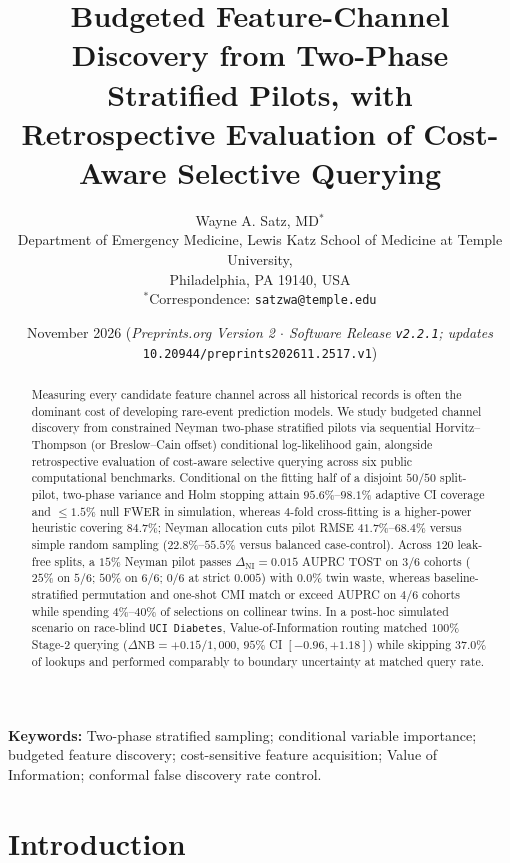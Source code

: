 \documentclass[11pt]{article}
\title{\textbf{Budgeted Feature-Channel Discovery from Two-Phase Stratified Pilots, with Retrospective Evaluation of Cost-Aware Selective Querying}}
\author{
  Wayne A. Satz, MD$^*$\\
  \small Department of Emergency Medicine, Lewis Katz School of Medicine at Temple University,\\
  \small Philadelphia, PA 19140, USA\\
  \small $^*$Correspondence: \texttt{satzwa@temple.edu}
}
\date{November 2026 \quad (\emph{Preprints.org Version 2 $\cdot$ Software Release \texttt{v2.2.1}; updates} \texttt{10.20944/preprints202611.2517.v1})}
\theoremstyle{remark}
\begin{document}
\maketitle

\begin{abstract}
Measuring every candidate feature channel across all historical records is often the dominant cost of developing rare-event prediction models. We study budgeted channel discovery from constrained Neyman two-phase stratified pilots via sequential Horvitz--Thompson (or Breslow--Cain offset) conditional log-likelihood gain, alongside retrospective evaluation of cost-aware selective querying across six public computational benchmarks. Conditional on the fitting half of a disjoint $50/50$ split-pilot, two-phase variance and Holm stopping attain $95.6\%\text{--}98.1\%$ adaptive CI coverage and $\le 1.5\%$ null FWER in simulation, whereas $4$-fold cross-fitting is a higher-power heuristic covering $84.7\%$; Neyman allocation cuts pilot RMSE $41.7\%\text{--}68.4\%$ versus simple random sampling ($22.8\%\text{--}55.5\%$ versus balanced case-control). Across $120$ leak-free splits, a $15\%$ Neyman pilot passes $\Delta_{\text{NI}}=0.015$ AUPRC TOST on $3/6$ cohorts ($25\%$ on $5/6$; $50\%$ on $6/6$; $0/6$ at strict $0.005$) with $0.0\%$ twin waste, whereas baseline-stratified permutation and one-shot CMI match or exceed AUPRC on $4/6$ cohorts while spending $4\%\text{--}40\%$ of selections on collinear twins. In a post-hoc simulated scenario on race-blind \texttt{UCI Diabetes}, Value-of-Information routing matched $100\%$ Stage-2 querying ($\Delta\text{NB} = +0.15/1{,}000$, $95\%$ CI $[-0.96, +1.18]$) while skipping $37.0\%$ of lookups and performed comparably to boundary uncertainty at matched query rate.
\end{abstract}

\vspace{4pt}
\noindent\textbf{Keywords:} Two-phase stratified sampling; conditional variable importance; budgeted feature discovery; cost-sensitive feature acquisition; Value of Information; conformal false discovery rate control.

\section{Introduction}
\label{sec:intro}
\end{document}
